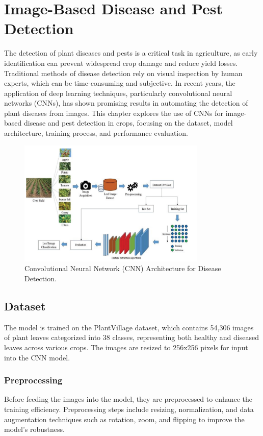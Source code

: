 \chapter{Image-Based Disease and Pest Detection}

The detection of plant diseases and pests is a critical task in agriculture, as
early identification can prevent widespread crop damage and reduce yield
losses. Traditional methods of disease detection rely on visual inspection by
human experts, which can be time-consuming and subjective. In recent years, the
application of deep learning techniques, particularly convolutional neural
networks (CNNs), has shown promising results in automating the detection of
plant diseases from images. This chapter explores the use of CNNs for
image-based disease and pest detection in crops, focusing on the dataset, model
architecture, training process, and performance evaluation.\cite{10.3389/fpls.2016.01419}

\begin{figure}[h!]
    \centering
    \includegraphics[width=0.8\textwidth]{cnn_architecture_diagram.png}
    \caption{Convolutional Neural Network (CNN) Architecture for Disease Detection.}
    \label{fig:cnn_architecture}
\end{figure}

\section{Dataset}
The model is trained on the PlantVillage dataset, which contains 54,306 images
of plant leaves categorized into 38 classes, representing both healthy and
diseased leaves across various crops. The images are resized to 256x256 pixels
for input into the CNN model. \cite{J2019}

\subsection{Preprocessing}
Before feeding the images into the model, they are preprocessed to enhance the
training efficiency. Preprocessing steps include resizing, normalization, and
data augmentation techniques such as rotation, zoom, and flipping to improve
the model's robustness. \cite{yim2021plantdiseasedetection}


